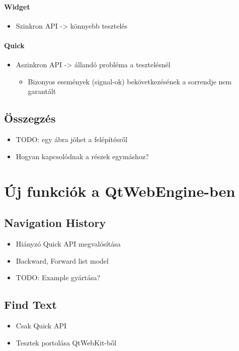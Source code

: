 \documentclass[12pt]{report}
\begin{document}
\subsubsection{Widget}
\begin{itemize}
    \item Szinkron API -> könnyebb tesztelés
\end{itemize}

\subsubsection{Quick}
\begin{itemize}
    \item Aszinkron API -> állandó probléma a tesztelésnél
        \begin{itemize}
            \item Bizonyos események (signal-ok) bekövetkezésének a sorrendje nem garantált
        \end{itemize}
\end{itemize}

\section{Összegzés}
\begin{itemize}
    \item TODO: egy ábra jöhet a felépítésről
    \item Hogyan kapcsolódnak a részek egymáshoz?
\end{itemize}


\chapter{Új funkciók a QtWebEngine-ben}

\section{Navigation History}

\begin{itemize}
    \item Hiányzó Quick API megvalósítása
    \item Backward, Forward list model
    \item TODO: Example gyártása?
\end{itemize}
\pagebreak

\section{Find Text}
\begin{itemize}
    \item Csak Quick API
    \item Tesztek portolása QtWebKit-ből
\end{itemize}
\pagebreak
\end{document}
